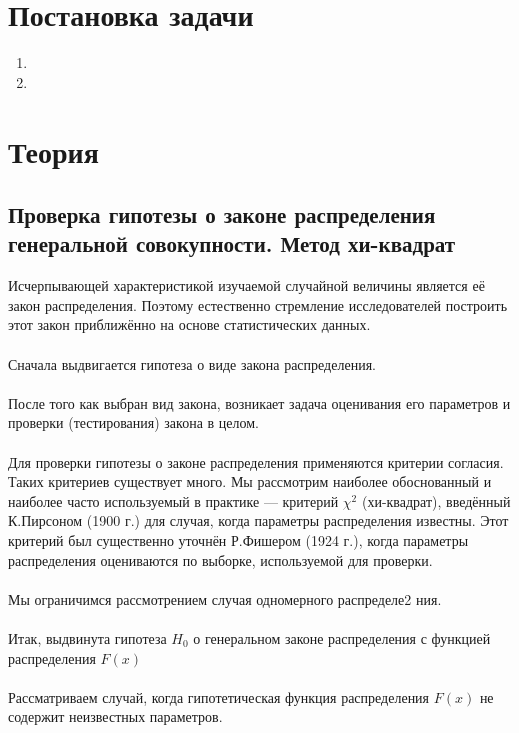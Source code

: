 \section{Постановка задачи}
    \begin{enumerate}
        \item 
        \item 
    \end{enumerate}

\section{Теория}    
    \subsection{Проверка гипотезы о законе распределения генеральной совокупности. Метод хи-квадрат}
    Исчерпывающей характеристикой изучаемой случайной величины является её закон распределения. Поэтому естественно стремление исследователей построить этот закон приближённо на основе статистических данных.\\ \\
    Сначала выдвигается гипотеза о виде закона распределения.\\ \\
    После того как выбран вид закона, возникает задача оценивания
его параметров и проверки (тестирования) закона в целом. \\ \\
Для проверки гипотезы о законе распределения применяются критерии согласия. Таких критериев существует много. Мы рассмотрим
наиболее обоснованный и наиболее часто используемый в практике
— критерий $\chi^2$ (хи-квадрат), введённый К.Пирсоном (1900 г.) для
случая, когда параметры распределения известны. Этот критерий
был существенно уточнён Р.Фишером (1924 г.), когда параметры
распределения оцениваются по выборке, используемой для проверки.\\ \\
Мы ограничимся рассмотрением случая одномерного распределе2
ния. \\ \\
Итак, выдвинута гипотеза $H_{0}$ о генеральном законе распределения
с функцией распределения $F(x)$ \\ \\
Рассматриваем случай, когда гипотетическая функция распределения $F(x)$ не содержит неизвестных параметров.\\ \\
